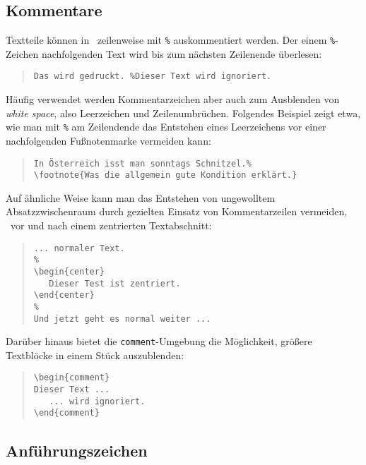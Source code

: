\subsection{Kommentare}
\label{sec:kommentare}


Textteile können in \latex\ zeilenweise mit \verb!%! auskommentiert werden. Der einem 
\verb!%!-Zeichen nachfolgenden Text wird bis zum nächsten Zeilenende überlesen:
%
\begin{quote}
\verb!Das wird gedruckt. %Dieser Text wird ignoriert.!
\end{quote}
%
Häufig verwendet werden Kommentarzeichen aber auch zum Ausblenden von 
\emph{white space}, also Leerzeichen und Zeilenumbrüchen.
Folgendes Beispiel zeigt etwa, wie man mit \verb!%! am Zeilendende das Entstehen
eines Leerzeichens vor einer nachfolgenden Fußnotenmarke vermeiden kann:
%
\begin{quote}
\begin{verbatim}
In Österreich isst man sonntags Schnitzel.%
\footnote{Was die allgemein gute Kondition erklärt.}
\end{verbatim}
\end{quote}
%

\begin{sloppypar}
\noindent
Auf ähnliche Weise kann man das Entstehen von ungewolltem Absatz\-zwischenraum durch 
gezielten Einsatz von Kommentarzeilen vermeiden, \zB\ vor und nach einem zentrierten
Textabschnitt:
\end{sloppypar}
%
\begin{quote}
\begin{verbatim}
... normaler Text.
%
\begin{center}
   Dieser Test ist zentriert.
\end{center}
%
Und jetzt geht es normal weiter ...
\end{verbatim}
\end{quote}
%
Darüber hinaus bietet die \verb!comment!-Umgebung die Möglichkeit, größere Text\-blöcke
in einem Stück auszublenden:
%
\begin{quote}
\begin{verbatim}
\begin{comment}
Dieser Text ...
   ... wird ignoriert.
\end{comment}
\end{verbatim}
\end{quote}




\subsection{Anführungszeichen}
\label{sec:anfuehrungszeichen}

